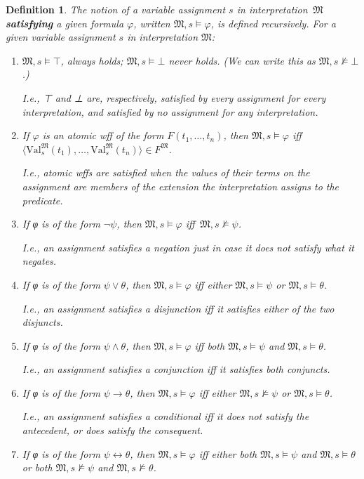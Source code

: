 \documentclass[12pt]{report}
\theoremstyle{nonumberplain}
\newtheorem{definition}{Definition}
\newcommand{\M}{\mathfrak{M}}
\newcommand{\Val}{\mathrm{Val}}
\newcommand{\ValMs}{\Val^{\M}_{s}}
\newcommand{\defm}[1]{\textbf{#1}\index{#1}}
\begin{document}
\begin{definition}
The notion of a variable assignment $s$ in interpretation \,$\M$ \defm{satisfying} a given formula $φ$, written $\M, s ⊨ φ$, is defined recursively. For a given variable assignment $s$ in interpretation $\M$:
\begin{enumerate}[label=\textup{(\roman*)},itemsep=0.5\baselineskip]

\item $\M, s ⊨ ⊤$, always holds; $\M, s ⊨ ⊥$ never holds. (We can write this as $\M, s ⊭ ⊥$.)

\textup{I.e., ⊤ and ⊥ are, respectively, satisfied by every assignment for every interpretation, and satisfied by no assignment for any interpretation.}

\item If $φ$ is an atomic wff of the form $F(t_1 , \dotsc , t_n)$, then $\M, s ⊨ φ$ iff $⟨\ValMs(t_1) , \dotsc , \ValMs(t_n)⟩∈F^{\M}$.

\textup{I.e., atomic wffs are satisfied when the values of their terms on the assignment are members of the extension the interpretation assigns to the predicate.}

\item If φ is of the form $¬ψ$, then $\M, s ⊨ φ$ iff \,$\M, s ⊭ ψ$.

\textup{I.e., an assignment satisfies a negation just in case it does not satisfy what it negates.}

\item If φ is of the form $ψ ∨ θ$, then $\M, s ⊨ φ$ iff either $\M, s ⊨ ψ$ or  $\M, s ⊨ θ$.

\textup{I.e., an assignment satisfies a disjunction iff it satisfies either of the two disjuncts.}

\item If φ is of the form $ψ ∧ θ$, then $\M, s ⊨ φ$ iff both $\M, s ⊨ ψ$ and $\M, s ⊨ θ$.

\textup{I.e., an assignment satisfies a conjunction iff it satisfies both conjuncts.}

\item If φ is of the form $ψ → θ$, then $\M, s ⊨ φ$ iff either $\M, s ⊭ ψ$ or $\M, s ⊨ θ$.

\textup{I.e., an assignment satisfies a conditional iff it does not satisfy the antecedent, or does satisfy the consequent.}

\item If φ is of the form $ψ ↔ θ$, then $\M, s ⊨ φ$ iff either both $\M, s ⊨ ψ$ and $\M, s ⊨ θ$ or both  $\M, s ⊭ ψ$ and $\M, s ⊭ θ$.\label{biconsem}


\end{enumerate}
\end{definition}
\end{document}
